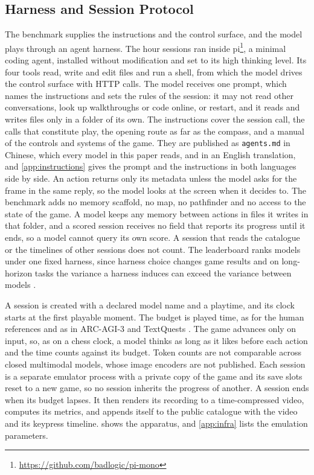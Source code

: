 \documentclass{article} %
\begin{document}
\subsection{Harness and Session Protocol}
\label{sec:protocol}

The benchmark supplies the instructions and the control surface, and the model plays through an agent harness. The hour sessions ran inside pi\footnote{\url{https://github.com/badlogic/pi-mono}}, a minimal coding agent, installed without modification and set to its high thinking level. Its four tools read, write and edit files and run a shell, from which the model drives the control surface with HTTP calls. The model receives one prompt, which names the instructions and sets the rules of the session: it may not read other conversations, look up walkthroughs or code online, or restart, and it reads and writes files only in a folder of its own. The instructions cover the session call, the calls that constitute play, the opening route as far as the compass, and a manual of the controls and systems of the game. They are published as \texttt{agents.md} in Chinese, which every model in this paper reads, and in an English translation, and \cref{app:instructions} gives the prompt and the instructions in both languages side by side. An action returns only its metadata unless the model asks for the frame in the same reply, so the model looks at the screen when it decides to. The benchmark adds no memory scaffold, no map, no pathfinder and no access to the state of the game. A model keeps any memory between actions in files it writes in that folder, and a scored session receives no field that reports its progress until it ends, so a model cannot query its own score. A session that reads the catalogue or the timelines of other sessions does not count. The leaderboard ranks models under one fixed harness, since harness choice changes game results \citep{hu2026lmgame,karten2026harness} and on long-horizon tasks the variance a harness induces can exceed the variance between models \citep{zhang2026harness}.

A session is created with a declared model name and a playtime, and its
clock starts at the first playable moment. The budget is played time, as for the human references and as in ARC-AGI-3 and TextQuests \citep{arc2026arcagi3,phan2025textquests}. The game advances only on input, so, as on a chess clock, a model thinks as long as it likes before each action and the time counts against its budget. Token counts are not comparable across closed multimodal models, whose image encoders are not published. Each session is a separate emulator process with a private copy of the game and its save slots reset to a new game, so no session inherits the progress of another. A session ends when its budget lapses. It then renders its recording to a time-compressed
video, computes its metrics, and appends itself to the public catalogue with the video and its keypress timeline.  shows the apparatus, and \cref{app:infra} lists the emulation parameters.
\end{document}
